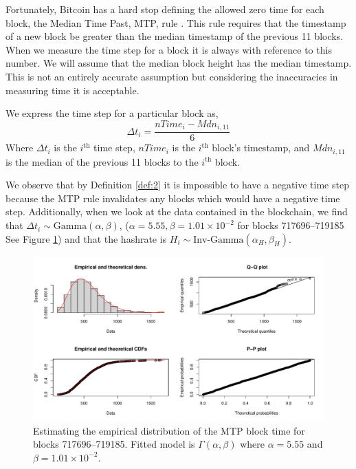 \documentclass[runningheads]{llncs}
\begin{document}
Fortunately, Bitcoin has a hard stop defining the allowed zero time for each block, the Median Time Past, MTP, rule \cite{bitcoin2021core}.
This rule requires that the timestamp of a new block be greater than the median timestamp of the previous 11 blocks.
When we measure the time step for a block it is always with reference to this number.
We will assume that the median block height has the median timestamp.
This is not an entirely accurate assumption but considering the inaccuracies in measuring time it is acceptable.
\begin{definition} \label{def:2}
    We express the time step for a particular block as,
    \begin{equation}
        \Delta t_i = \frac{nTime_i - Mdn_{i,11}}{6}
    \end{equation}
    Where $\Delta t_i$ is the $i^{\mbox{th}}$ time step, $nTime_i$ is the $i^{\mbox{th}}$ block's timestamp, and $Mdn_{i,11}$ is the median of the previous 11 blocks to the $i^{\mbox{th}}$ block.
\end{definition}

We observe that by Definition \ref{def:2} it is impossible to have a negative time step because the MTP rule invalidates any blocks which would have a negative time step.
Additionally, when we look at the data contained in the blockchain, we find that $\Delta t_i \sim \mbox{Gamma}(\alpha, \beta)$, ($\alpha = 5.55, \beta = 1.01\times 10^{-2}$ for blocks 717696--719185 See Figure \ref{fig:4}) and that the hashrate is $H_i \sim \mbox{Inv-Gamma}(\alpha_H, \beta_H)$.
\begin{figure}
    \includegraphics[width=\textwidth]{BTC MTP Emperical Distribution Fit.pdf}
    \caption{
        Estimating the empirical distribution of the MTP block time for blocks 717696--719185.
        Fitted model is $\Gamma(\alpha,\beta)$ where $\alpha = 5.55$ and $\beta = 1.01\times 10^{-2}$.
    }\label{fig:4}
\end{figure}
\end{document}
